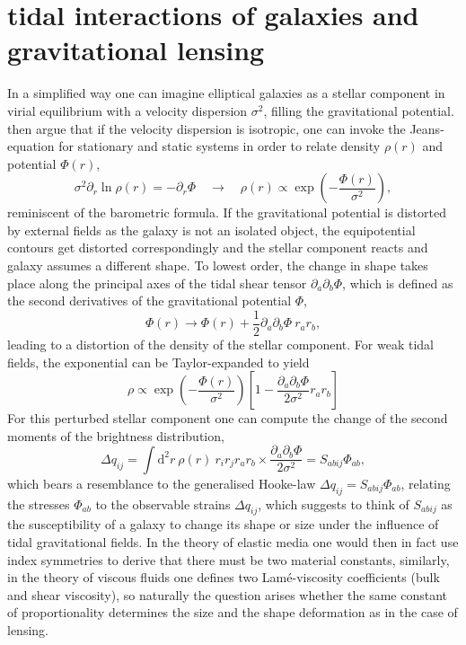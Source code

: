 \documentclass[a4paper,fleqn,usenatbib]{mnras}
\newcommand{\dd}{\mathrm{d}}
\begin{document}
\section{tidal interactions of galaxies and gravitational lensing}\label{sect_tidal}
In a simplified way one can imagine elliptical galaxies as a stellar component in virial equilibrium with a velocity dispersion $\sigma^2$, filling the gravitational potential. \citet{piras_mass_2018} then argue that if the velocity dispersion is isotropic, one can invoke the Jeans-equation for stationary and static systems in order to relate density $\rho(r)$ and potential $\Phi(r)$,
\begin{equation}
\sigma^2\partial_r\ln\rho(r) = -\partial_r\Phi
\quad\rightarrow\quad
\rho(r) \propto \exp\left(-\frac{\Phi(r)}{\sigma^2}\right),
\end{equation}
reminiscent of the barometric formula. If the gravitational potential is distorted by external fields as the galaxy is not an isolated object, the equipotential contours get distorted correspondingly and the stellar component reacts and galaxy assumes a different shape. To lowest order, the change in shape takes place along the principal axes of the tidal shear tensor $\partial_a\partial_b\Phi$, which is defined as the second derivatives of the gravitational potential $\Phi$,
\begin{equation}
\Phi(r) \rightarrow \Phi(r) + \frac{1}{2}\partial_a\partial_b\Phi\:r_a r_b,
\end{equation}
leading to a distortion of the density of the stellar component. For weak tidal fields, the exponential can be Taylor-expanded to yield
\begin{equation}
\rho \propto 
\exp\left(-\frac{\Phi(r)}{\sigma^2}\right)\left[1-\frac{\partial_a\partial_b\Phi}{2\sigma^2}r_a r_b\right]
\end{equation}
For this perturbed stellar component one can compute the change of the second moments of the brightness distribution,
\begin{equation}
\Delta q_{ij} = 
\int\dd^2r\:\rho(r)\: r_i r_j r_a r_b\times\frac{\partial_a\partial_b\Phi}{2\sigma^2} = S_{abij}\Phi_{ab},
\end{equation}
which bears a resemblance to the generalised Hooke-law $\Delta q_{ij} = S_{abij}\Phi_{ab}$, relating the stresses $\Phi_{ab}$ to the observable strains $\Delta q_{ij}$, which suggests to think of $S_{abij}$ as the susceptibility of a galaxy to change its shape or size under the influence of tidal gravitational fields. In the theory of elastic media one would then in fact use index symmetries to derive that there must be two material constants, similarly, in the theory of viscous fluids one defines two Lam{\'e}-viscosity coefficients (bulk and shear viscosity), so naturally the question arises whether the same constant of proportionality determines the size and the shape deformation as in the case of lensing.
\end{document}
